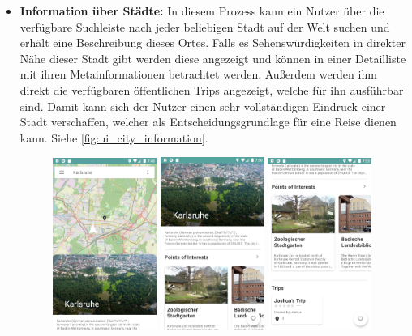 \begin{itemize}
	\newpage

 
	\item \textbf{Information über Städte:} In diesem Prozess kann ein Nutzer über die verfügbare Suchleiste nach jeder beliebigen Stadt auf der Welt suchen und erhält eine Beschreibung dieses Ortes. Falls es Sehenswürdigkeiten in direkter Nähe dieser Stadt gibt werden diese angezeigt und können in einer Detailliste mit ihren Metainformationen betrachtet werden. Außerdem werden ihm direkt die verfügbaren öffentlichen Trips angezeigt, welche für ihn ausführbar sind. Damit kann sich der Nutzer einen sehr vollständigen Eindruck einer Stadt verschaffen, welcher als Entscheidungsgrundlage für eine Reise dienen kann. Siehe \autoref{fig:ui_city_information}.
	
	\begin{figure}[ht!]
		\includegraphics[width=0.32\textwidth]{images/travlyn-screenshot-search-result.png}
		\includegraphics[width=0.32\textwidth]{images/travlyn-screenshot-city-detail.png}
		\includegraphics[width=0.32\textwidth]{images/travlyn-screenshot-city-detail-trips.png}

\end{figure}
\end{itemize}
